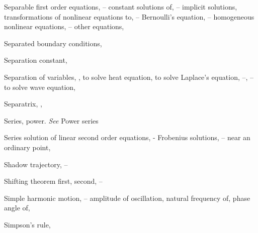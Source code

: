\begin{theindex}
  \item Separable first order equations, \pageref{eq:2.2.1}--\pageref{exer:2.2.39}
    \subitem constant solutions of, \pageref{eq:2.2.16}--\pageref{eq:2.2.19}
    \subitem implicit solutions, \pageref{thmtype:2.2.1}
    \subitem transformations of nonlinear equations to, \pageref{eq:2.4.1}--\pageref{example:2.4.1}
      \subsubitem Bernoulli's equation, \pageref{eq:2.4.1}--\pageref{exer:2.4.1}
      \subsubitem homogeneous nonlinear equations, \pageref{eq:2.4.7}--\pageref{exer:2.4.1}
      \subsubitem other equations, \pageref{eq:2.4.4}

  \item Separated boundary conditions, \pageref{eq:13.1.5}

  \item Separation constant, \pageref{eq:12.1.2}

  \item Separation of variables, \pageref{eq:2.1.16}, \pageref{eq:2.2.1}
    \subitem to solve heat equation, \pageref{eq:12.1.1}
    \subitem to solve Laplace's equation, \pageref{example:12.3.1}--\pageref{exer:12.3.1}, \pageref{eq:12.4.3}--\pageref{exer:12.4.7}
    \subitem to solve wave equation, \pageref{eq:12.2.5}

  \item Separatrix, \pageref{eq:4.4.23}, \pageref{figure:4.4.7}

  \item Series, power. \emph{See} Power series

  \item Series solution of linear second order equations, \pageref{eq:7.1.1}-\pageref{exer:7.7.48}
    \subitem Frobenius solutions, \pageref{eq:7.5.1}--\pageref{exer:7.7.48}
    \subitem near an ordinary point, \pageref{eq:7.2.1}

  \item Shadow trajectory, \pageref{eq:10.6.13}--\pageref{exer:10.6.1}

  \item Shifting theorem
    \subitem first, \pageref{thmtype:8.1.3}
    \subitem second, \pageref{thmtype:8.4.2}--\pageref{exer:8.4.1}

  \item Simple harmonic motion, \pageref{example:6.1.1}--\pageref{eq:6.1.13}
    \subitem amplitude of oscillation, \pageref{eq:6.1.10}
    \subitem natural frequency of, \pageref{eq:6.1.11}
    \subitem phase angle of, \pageref{eq:6.1.11}

  \item Simpson's rule, \pageref{exer:3.3.28}


\end{theindex}

